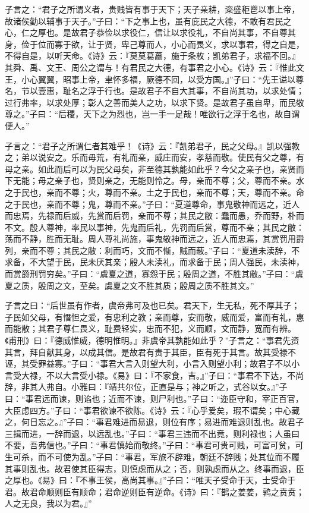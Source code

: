\documentclass[]{article}
\begin{document}
子言之：``君子之所谓义者，贵贱皆有事于天下；天子亲耕，粢盛秬鬯以事上帝，故诸侯勤以辅事于天子。''子曰：``下之事上也，虽有庇民之大德，不敢有君民之心，仁之厚也。是故君子恭俭以求役仁，信让以求役礼，不自尚其事，不自尊其身，俭于位而寡于欲，让于贤，卑己尊而人，小心而畏义，求以事君，得之自是，不得自是，以听天命。《诗》云：『莫莫葛藟，施于条枚；凯弟君子，求福不回。』其舜、禹、文王、周公之谓与！有君民之大德，有事君之小心。《诗》云：『惟此文王，小心翼翼，昭事上帝，聿怀多福，厥德不回，以受方国。』''子曰：``先王谥以尊名，节以壹惠，耻名之浮于行也。是故君子不自大其事，不自尚其功，以求处情；过行弗率，以求处厚；彰人之善而美人之功，以求下贤。是故君子虽自卑，而民敬尊之。''子曰：``后稷，天下之为烈也，岂一手一足哉！唯欲行之浮于名也，故自谓便人。''

子言之：``君子之所谓仁者其难乎！《诗》云：『凯弟君子，民之父母。』凯以强教之；弟以说安之。乐而毋荒，有礼而亲，威庄而安，孝慈而敬。使民有父之尊，有母之亲。如此而后可以为民父母矣，非至德其孰能如此乎？今父之亲子也，亲贤而下无能；母之亲子也，贤则亲之，无能则怜之。母，亲而不尊；父，尊而不亲。水之于民也，亲而不尊；火，尊而不亲。土之于民也，亲而不尊；天，尊而不亲。命之于民也，亲而不尊；鬼，尊而不亲。''子曰：``夏道尊命，事鬼敬神而远之，近人而忠焉，先禄而后威，先赏而后罚，亲而不尊；其民之敝：蠢而愚，乔而野，朴而不文。殷人尊神，率民以事神，先鬼而后礼，先罚而后赏，尊而不亲；其民之敝：荡而不静，胜而无耻。周人尊礼尚施，事鬼敬神而远之，近人而忠焉，其赏罚用爵列，亲而不尊；其民之敝：利而巧，文而不惭，贼而蔽。''子曰：``夏道未渎辞，不求备，不大望于民，民未厌其亲；殷人未渎礼，而求备于民；周人强民，未渎神，而赏爵刑罚穷矣。''子曰：``虞夏之道，寡怨于民；殷周之道，不胜其敝。''子曰：``虞夏之质，殷周之文，至矣。虞夏之文不胜其质；殷周之质不胜其文。''

子言之曰：``后世虽有作者，虞帝弗可及也已矣。君天下，生无私，死不厚其子；子民如父母，有憯怛之爱，有忠利之教；亲而尊，安而敬，威而爱，富而有礼，惠而能散；其君子尊仁畏义，耻费轻实，忠而不犯，义而顺，文而静，宽而有辨。《甫刑》曰：『德威惟威，德明惟明。』非虞帝其孰能如此乎？''子言之：``事君先资其言，拜自献其身，以成其信。是故君有责于其臣，臣有死于其言。故其受禄不诬，其受罪益寡。''子曰：``事君大言入则望大利，小言入则望小利；故君子不以小言受大禄，不以大言受小禄。《易》曰：『不家食，吉。』''子曰：``事君不下达，不尚辞，非其人弗自。小雅曰：『靖共尔位，正直是与；神之听之，式谷以女。』''子曰：``事君远而谏，则谄也；近而不谏，则尸利也。''子曰：``迩臣守和，宰正百官，大臣虑四方。''子曰：``事君欲谏不欲陈。《诗》云：『心乎爱矣，瑕不谓矣；中心藏之，何日忘之。』''子曰：``事君难进而易退，则位有序；易进而难退则乱也。故君子三揖而进，一辞而退，以远乱也。''子曰：``事君三违而不出竟，则利禄也；人虽曰不要，吾弗信也。''子曰：``事君慎始而敬终。''子曰：``事君可贵可贱，可富可贫，可生可杀，而不可使为乱。''子曰：``事君，军旅不辟难，朝廷不辞贱；处其位而不履其事则乱也。故君使其臣得志，则慎虑而从之；否，则孰虑而从之。终事而退，臣之厚也。《易》曰：『不事王侯，高尚其事。』''子曰：``唯天子受命于天，士受命于君。故君命顺则臣有顺命；君命逆则臣有逆命。《诗》曰：『鹊之姜姜，鹑之贲贲；人之无良，我以为君。』''
\end{document}

